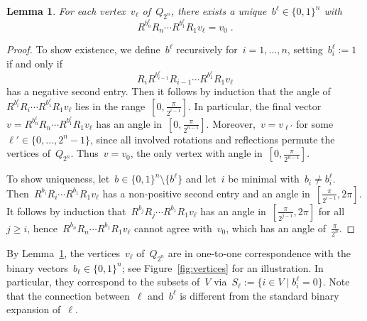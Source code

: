 \documentclass{article}
\newtheorem{lemma}[theorem]{Lemma}
\begin{document}
\begin{lemma}\label{lem:basic}
  For each vertex~$v_\ell$ of~$Q_{2^n}$, there exists a
  unique~$b^\ell\in\{0,1\}^n$ with
  \[
  R^{b^\ell_n}R_n\cdots R^{b^\ell_1}R_1 v_\ell=v_0\;.
  \]
\end{lemma}
\begin{proof}
  To show existence, we define~$b^\ell$ recursively for~$i=1,\dots,n$,
  setting~$b^\ell_i:=1$ if and only
  if
  $$R_{i}R^{b^\ell_{i-1}}R_{i-1}\cdots R^{b^\ell_1}R_1 v_\ell$$
  has a
  negative second entry. Then it follows by induction that the angle
  of~$R^{b^\ell_{i}}R_{i}\cdots R^{b^\ell_1}R_1 v_\ell$ lies in the
  range~$[0,\tfrac\pi{2^{i-1}}]$. In particular, the final
  vector~$v=R^{b^\ell_{n}}R_{n}\cdots R^{b^\ell_1}R_1 v_\ell$ has an
  angle in~$[0,\tfrac\pi{2^{n-1}}]$. Moreover,~$v=v_{\ell'}$ for
  some~$\ell'\in\{0,\dots,2^n-1\}$, since all involved rotations and
  reflections permute the vertices of~$Q_{2^n}$. Thus~$v=v_0$, the
  only vertex with angle in~$[0,\tfrac\pi{2^{n-1}}]$.

  To show uniqueness, let~$b\in\{0,1\}^n\setminus\{b^\ell\}$ and
  let~$i$ be minimal with~$b_i\neq b^\ell_i$. Then~$R^{b_i}R_{i}\cdots
  R^{b_1}R_1 v_\ell$ has a non-positive second entry and an angle
  in~$[\tfrac\pi{2^{i-1}},2\pi]$. It follows by induction
  that~$R^{b_j}R_{j}\cdots R^{b_1}R_1 v_\ell$ has an angle
  in~$[\tfrac\pi{2^{j-1}},2\pi]$ for all~$j\ge i$,
  hence~$R^{b_n}R_{n}\cdots R^{b_1}R_1 v_\ell$ cannot agree
  with~$v_0$, which has an angle of~$\tfrac\pi{2^n}$.
\end{proof}
By Lemma~\ref{lem:basic}, the vertices~$v_\ell$ of~$Q_{2^n}$ are in
one-to-one correspondence with the binary
vectors~$b_\ell\in\{0,1\}^n$; see Figure~\ref{fig:vertices} for an
illustration. In particular, they correspond to the subsets of~$V$
via~$S_\ell:=\{i\in V\mid b^\ell_i=0\}$. Note that the connection
between~$\ell$ and~$b^\ell$ is different from the standard binary
expansion of~$\ell$.
\end{document}
